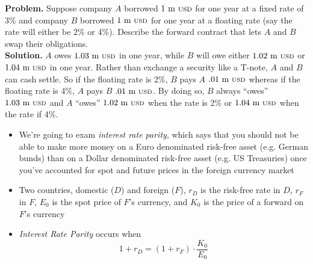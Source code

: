 \documentclass{beamer}
\begin{document}
\begin{frame}{}
	\textbf{Problem.} Suppose company $A$ borrowed $1\text{ m {\scriptsize USD}}$ for one year at a fixed rate of 3\% and company $B$ borrowed $1\text{ m {\scriptsize USD}}$ for one year at a floating rate (say the rate will either be 2\% or 4\%). Describe the forward contract that lets $A$ and $B$ swap their obligations.\\
	\vfill
	\textbf{Solution.} $A$ owes $1.03\text{ m {\scriptsize USD}}$ in one year, while $B$ will owe either $1.02\text{ m {\scriptsize USD}}$ or $1.04\text{ m {\scriptsize USD}}$ in one year. Rather than exchange a security like a T-note, $A$ and $B$ can cash settle. So if the floating rate is 2\%, $B$ pays $A$ $.01\text{ m {\scriptsize USD}}$ whereas if the floating rate is 4\%, $A$ pays $B$ $.01\text{ m {\scriptsize USD}}$. By doing so, $B$ always ``owes'' $1.03\text{ m {\scriptsize USD}}$ and $A$ ``owes'' $1.02\text{ m {\scriptsize USD}}$ when the rate is 2\% or $1.04\text{ m {\scriptsize USD}}$ when the rate if 4\%.
\end{frame}

\begin{frame}{}
	\begin{itemize}
		\item We're going to exam \textit{interest rate parity}, which says that you should not be able to make more money on a Euro denominated risk-free asset (e.g. German bunds) than on a Dollar denominated risk-free asset (e.g. US Treasuries) once you've accounted for spot and future prices in the foreign currency market
    \end{itemize}
\end{frame}

\begin{frame}{}
    \begin{itemize}
        \item Two countries, domestic ($D$) and foreign ($F$), $r_{D}$ is the risk-free rate in $D$, $r_{F}$ in $F$, $E_{0}$ is the spot price of $F$'s currency, and $K_{0}$ is the price of a forward on $F$'s currency
		\item \textit{Interest Rate Parity} occurs when
            \begin{equation}
				\boxed{1+r_{D}=(1+r_{F})\cdot\frac{K_{0}}{E_{0}}}
            \end{equation}
    \end{itemize}
\end{frame}
\end{document}
